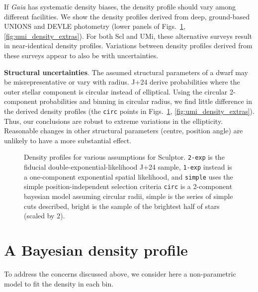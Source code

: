 If \emph{Gaia} has systematic density biases, the density profile should
vary among different facilities. We show the density profiles derived
from deep, ground-based UNIONS and DEVLE photometry (lower panels of
Figs.~\ref{fig:scl_density_extras}, \ref{fig:umi_density_extras}). For
both Scl and UMi, these alternative surveys result in near-identical
density profiles. Variations between density profiles derived from these
surveys appear to also be with uncertainties.

\textbf{Structural uncertainties}. The assumed structural parameters of
a dwarf may be misrepresentative or vary with radius. J+24 derive
probabilities where the outer stellar component is circular instead of
elliptical. Using the circular 2-component probabilities and binning in
circular radius, we find little difference in the derived density
profiles (the \texttt{circ} points in
Figs.~\ref{fig:scl_density_extras}, \ref{fig:umi_density_extras}). Thus,
our conclusions are robust to extreme variations in the ellipticity.
Reasonable changes in other structural parameters (centre, position
angle) are unlikely to have a more substantial effect.

\begin{figure}
\centering
{}
\caption[Sculptor density methodology comparison]{Density profiles for
various assumptions for Sculptor. \texttt{2-exp} is the fiducial
double-exponential-likelihood J+24 sample, \texttt{1-exp} instead is a
one-component exponential spatial likelihood, and \texttt{simple} uses
the simple position-independent selection criteria \texttt{circ} is a
2-component bayesian model assuming circular radii, simple is the series
of simple cuts described, bright is the sample of the brightest half of
stars (scaled by 2).}\label{fig:scl_density_extras}
\end{figure}

\section{A Bayesian density profile}\label{sec:mcmc_hists}

To address the concerns discussed above, we consider here a
non-parametric model to fit the density in each bin.

